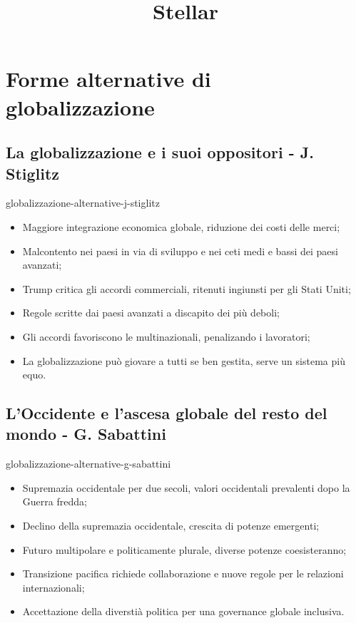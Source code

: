 \documentclass[preview]{standalone}
\begin{document}
\title{Stellar}
\genpage


\section{Forme alternative di globalizzazione}

\subsection{La globalizzazione e i suoi oppositori - J. Stiglitz}

\begin{snippet}{globalizzazione-alternative-j-stiglitz}
    \vspace{-0.25cm}
    \begin{itemize}
        \item Maggiore integrazione economica globale, riduzione dei costi delle merci;
        \item Malcontento nei paesi in via di sviluppo e nei ceti medi e bassi dei paesi avanzati;
        \item Trump critica gli accordi commerciali, ritenuti ingiunsti per gli Stati Uniti;
        \item Regole scritte dai paesi avanzati a discapito dei più deboli;
        \item Gli accordi favoriscono le multinazionali, penalizando i lavoratori;
        \item La globalizzazione può giovare a tutti se ben gestita, serve un sistema più equo.
    \end{itemize}
\end{snippet}

\subsection{L'Occidente e l'ascesa globale del resto del mondo - G. Sabattini}

\begin{snippet}{globalizzazione-alternative-g-sabattini}
    \vspace{-0.25cm}
    \begin{itemize}
        \item Supremazia occidentale per due secoli, valori occidentali prevalenti dopo la Guerra
            fredda;
        \item Declino della supremazia occidentale, crescita di potenze emergenti;
        \item Futuro multipolare e politicamente plurale, diverse potenze coesisteranno;
        \item Transizione pacifica richiede collaborazione e nuove regole per le relazioni
            internazionali;
        \item Accettazione della diverstià politica per una governance globale inclusiva.
    \end{itemize}
\end{snippet}
\end{document}
